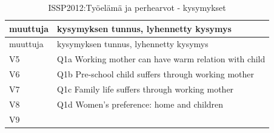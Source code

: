 \documentclass[
  finnish,
]{book}
\begin{document}
\begin{longtable}[]{@{}ll@{}}
\caption{ISSP2012:Työelämä ja perhearvot - kysymykset}\tabularnewline
\toprule
\begin{minipage}[b]{0.09\columnwidth}\raggedright
muuttuja\strut
\end{minipage} & \begin{minipage}[b]{0.85\columnwidth}\raggedright
kysymyksen tunnus, lyhennetty kysymys\strut
\end{minipage}\tabularnewline
\midrule
\endfirsthead
\toprule
\begin{minipage}[b]{0.09\columnwidth}\raggedright
muuttuja\strut
\end{minipage} & \begin{minipage}[b]{0.85\columnwidth}\raggedright
kysymyksen tunnus, lyhennetty kysymys\strut
\end{minipage}\tabularnewline
\midrule
\endhead
\begin{minipage}[t]{0.09\columnwidth}\raggedright
V5\strut
\end{minipage} & \begin{minipage}[t]{0.85\columnwidth}\raggedright
Q1a Working mother can have warm relation with child\strut
\end{minipage}\tabularnewline
\begin{minipage}[t]{0.09\columnwidth}\raggedright
V6\strut
\end{minipage} & \begin{minipage}[t]{0.85\columnwidth}\raggedright
Q1b Pre-school child suffers through working mother\strut
\end{minipage}\tabularnewline
\begin{minipage}[t]{0.09\columnwidth}\raggedright
V7\strut
\end{minipage} & \begin{minipage}[t]{0.85\columnwidth}\raggedright
Q1c Family life suffers through working mother\strut
\end{minipage}\tabularnewline
\begin{minipage}[t]{0.09\columnwidth}\raggedright
V8\strut
\end{minipage} & \begin{minipage}[t]{0.85\columnwidth}\raggedright
Q1d Women's preference: home and children\strut
\end{minipage}\tabularnewline
\begin{minipage}[t]{0.09\columnwidth}\raggedright
V9\strut
\end{minipage} & \begin{minipage}[t]{0.85\columnwidth}\raggedright

\end{minipage}
\end{longtable}
\end{document}
